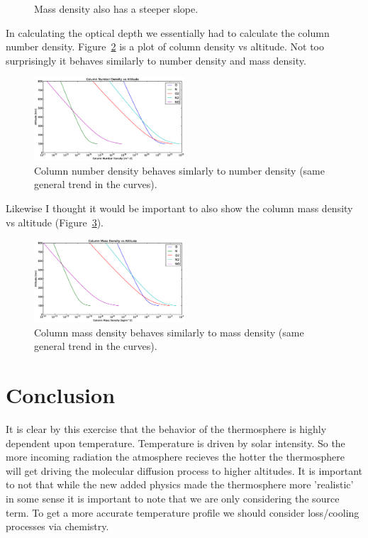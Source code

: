 \documentclass[10pt]{article}
\begin{document}
\begin{multicols}{2}
\begin{figure}[H]
	\caption{Mass density also has a steeper slope.}
	\label{fig:mass_density}
\end{figure}
In calculating the optical depth we essentially had to calculate the column number density. Figure~\ref{fig:column_number} is a plot of column density vs altitude. Not too surprisingly it behaves similarly to number density and mass density.
\begin{figure}[H]
	\centering
		\includegraphics[width=0.5\textwidth]{./Figures/Column_Number_Density_vs_Altitude.eps}
	\caption{Column number density behaves simlarly to number density (same general trend in the curves).}
	\label{fig:column_number}
\end{figure}
Likewise I thought it would be important to also show the column mass density vs altitude (Figure~\ref{fig:column_mass}).
\begin{figure}[H]
	\centering
		\includegraphics[width=0.5\textwidth]{./Figures/Column_Mass_Density_vs_Altitude.eps}
	\caption{Column mass density behaves similarly to mass density (same general trend in the curves).}
	\label{fig:column_mass}
\end{figure}



\section{Conclusion}
It is clear by this exercise that the behavior of the thermosphere is highly dependent upon temperature. Temperature is driven by solar intensity. So the more incoming radiation the atmosphere recieves the hotter the thermosphere will get driving the molecular diffusion process to higher altitudes. It is important to not that while the new added physics made the thermosphere more 'realistic' in some sense it is important to note that we are only considering the source term. To get a more accurate temperature profile we should consider loss/cooling processes via chemistry.



\end{multicols}
\end{document}
